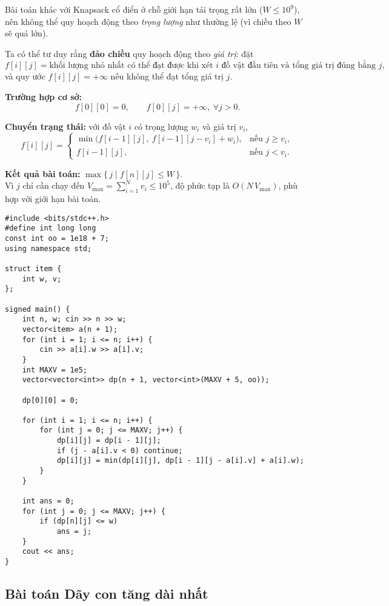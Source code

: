 Bài toán khác với Knapsack cổ điển ở chỗ giới hạn tải trọng rất lớn ($W \le 10^9$), nên không thể quy hoạch động theo \emph{trọng lượng} như thường lệ (vì chiều theo $W$ sẽ quá lớn).

Ta có thể tư duy rằng \textbf{đảo chiều} quy hoạch động theo \emph{giá trị}: đặt
\[
f[i][j] = \text{khối lượng nhỏ nhất có thể đạt được khi xét } i \text{ đồ vật đầu tiên và tổng giá trị đúng bằng } j,
\]
và quy ước $f[i][j]=+\infty$ nếu không thể đạt tổng giá trị $j$.

\textbf{Trường hợp cơ sở:}
\[
f[0][0] = 0,\qquad f[0][j] = +\infty, \ \forall j>0.
\]

\textbf{Chuyển trạng thái:} với đồ vật $i$ có trọng lượng $w_i$ và giá trị $v_i$,
\[
f[i][j] =
\begin{cases}
\min\big(f[i-1][j],\ f[i-1][j - v_i] + w_i\big), & \text{nếu } j \ge v_i,\\[4pt]
f[i-1][j], & \text{nếu } j < v_i.
\end{cases}
\]

\textbf{Kết quả bài toán:} $\max \{\, j \mid f[n][j] \le W \,\}.$\\


Vì $j$ chỉ cần chạy đến $V_{\max}=\sum_{i=1}^N v_i \le 10^5$, độ phức tạp là $O(N\,V_{\max})$, phù hợp  với giới hạn bài toán. 

\begin{lstlisting}[title=\centering \textbf{Cài đặt}]
#include <bits/stdc++.h>
#define int long long
const int oo = 1e18 + 7;
using namespace std;

struct item {
    int w, v;
};

signed main() {
    int n, w; cin >> n >> w;
    vector<item> a(n + 1);
    for (int i = 1; i <= n; i++) {
        cin >> a[i].w >> a[i].v;
    }    
    int MAXV = 1e5;
    vector<vector<int>> dp(n + 1, vector<int>(MAXV + 5, oo));

    dp[0][0] = 0;

    for (int i = 1; i <= n; i++) {
        for (int j = 0; j <= MAXV; j++) {
            dp[i][j] = dp[i - 1][j];
            if (j - a[i].v < 0) continue;
            dp[i][j] = min(dp[i][j], dp[i - 1][j - a[i].v] + a[i].w);
        }
    }

    int ans = 0;
    for (int j = 0; j <= MAXV; j++) {
        if (dp[n][j] <= w)
            ans = j;
    }
    cout << ans;
}
\end{lstlisting}


\subsection{Bài toán Dãy con tăng dài nhất}

